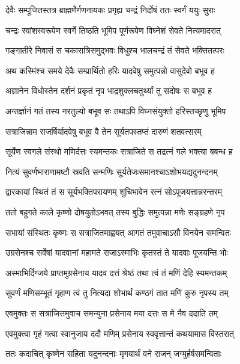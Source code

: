 \twolineshloka
{देवैः सम्पूजितस्तत्र ब्राह्मणैर्गणनायकः}
{प्रगृह्य चन्द्रं निर्दोषं ततः स्वर्गं ययुः सुराः} %

\twolineshloka
{चन्द्रः स्वांशस्वरूपेण स्वर्गे तिष्ठति भूमिप}
{पूर्णरूपेण विघ्नेशं सेवते नित्यमादरात्} %

\twolineshloka
{गङ्गातीरे निवासं स चकारात्रिसमुद्भवः}
{विधुश्च भालचन्द्रं तं सेवते भक्तितत्परः} %

\twolineshloka
{अथ कस्मिंश्च समये देवैः सम्प्रार्थितो हरिः}
{यादवेषु समुत्पन्नो वासुदेवो बभूव ह} %

\twolineshloka
{अज्ञानेन विधोस्तेन दर्शनं प्रकृतं नृप}
{भाद्रशुक्लचतुर्थ्यां तु सदोषः स बभूव ह} %

\twolineshloka
{अन्तर्ज्ञानं गतं तस्य नरतुल्यो बभूव सः}
{तथाऽपि विघ्नसंयुक्तो हरिस्तच्छृणु भूमिप} %

\twolineshloka
{सत्राजिन्नाम राजर्षिर्यादवेषु बभूव वै}
{तेन सूर्यतपस्तप्तं दारुणं शतवत्सरम्} %

\twolineshloka
{सूर्येण स्वगले संस्थो मणिर्दत्तः स्यमन्तकः}
{सत्राजिते स तद्रत्नं गले भक्त्या बबन्ध ह} %

\twolineshloka
{नित्यं सुवर्णभाराणामष्टौ स्रवति सन्मणिः}
{सूर्यतेजःसमानश्चाऽशोभयद्यदुनन्दनम्} %

\twolineshloka
{द्वारकायां स्थितं तं स सूर्यभक्तिपरायणम्}
{शुचिभावेन रत्नं सोऽपूजयत्तान्नरन्तरम्} %

\twolineshloka
{ततो बहुगते काले कृष्णो दोषयुतोऽभवत्}
{तस्य बुद्धिः समुत्पन्ना मणेः सङ्ग्रहणे नृप} %

\twolineshloka
{सभायां संस्थितः कृष्णः स सत्राजितमाह्वयत्}
{आगतं तमुवाचाऽसौ विनयेन समन्वितः} %


\twolineshloka
{उग्रसेनश्च सर्वेषां यादवानां महामते}
{राजाऽस्माभिः कृतस्तं ते यादवाः पूजयन्ति भोः} %

\twolineshloka
{अस्माभिर्दिग्जये प्राप्तमुग्रसेनाय यादव}
{दत्तं श्रेष्ठं तथा त्वं तं मणिं देहि स्यमन्तकम्} %

\twolineshloka
{सुवर्णं मणिसम्भूतं गृहाण त्वं तु नित्यदा}
{शोभार्थं कण्ठगं तात मणिं कुरु नृपस्य तम्} %

\twolineshloka
{एवमुक्तः स सत्राजित्तमुवाच समन्युना}
{प्रसेनाय मया दत्तः स मे नैव ददाति तम्} %

\twolineshloka
{एवमुक्त्वा गृहं गत्वा स्वानुजाय ददौ मणिम्}
{प्रसेनाय स्ववृत्तान्तं कथयामास विस्तरात्} %

\twolineshloka
{ततः कदाचित् कृष्णेन सहिता यदुनन्दनाः}
{मृगयार्थं वने राजन् जग्मुर्हर्षसमन्विताः} %

